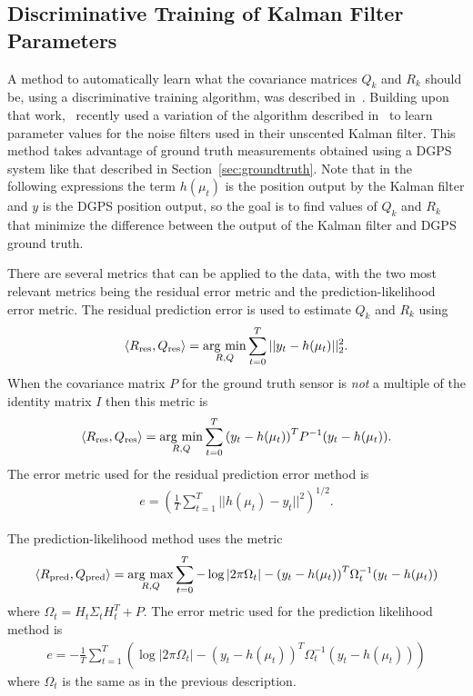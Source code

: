 \subsection{Discriminative Training of Kalman Filter Parameters}%
\label{sec:kftrainingparams}
A method to automatically learn what the covariance matrices $Q_k$ and $R_k$ should be, using a discriminative training algorithm, was described in~\cite{Abbeel-RSS-05}.
Building upon that work,~\cite{SakaiKuroda10} recently used a variation of the algorithm described in~\cite{Abbeel-RSS-05} to learn parameter values for the noise filters used in their unscented Kalman filter.
This method takes advantage of ground truth measurements obtained using a DGPS system like that described in Section~\ref{sec:groundtruth}.
Note that in the following expressions the term $h(\mu_t)$ is the position output by the Kalman filter and $y$ is the DGPS position output, so the goal is to find values of $Q_k$ and $R_k$ that minimize the difference between the output of the Kalman filter and DGPS ground truth.

There are several metrics that can be applied to the data, with the two most relevant metrics being the residual error metric and the prediction-likelihood error metric.
The residual prediction error is used to estimate $Q_k$ and $R_k$ using
\begin{align*}
\left<R_{\text{res}},Q_{\text{res}}\right> = \mathop{\arg\,\min}\limits_{R,Q}\sum_{t=0}^T ||y_t-h(\mu_t)||_2^2.
\end{align*}
When the covariance matrix $P$ for the ground truth sensor is \textit{not} a multiple of the identity matrix $I$ then this metric is
\begin{align*}
\left<R_{\text{res}},Q_{\text{res}}\right> = \mathop{\arg\,\min}\limits_{R,Q}\sum_{t=0}^T {(y_t-h(\mu_t))}^T P^{-1}(y_t-h(\mu_t)).
\end{align*}
The error metric used for the residual prediction error method is
\begin{align}
\label{eq:kftrainingres}
e = {\left(\frac{1}{T}\sum_{t=1}^T ||h(\mu_t)-y_t||^2\right)}^{1/2}.
\end{align}

The prediction-likelihood method uses the metric
\begin{align*}
\left<R_{\text{pred}},Q_{\text{pred}}\right> = \mathop{\arg\,\max}\limits_{R,Q}\sum_{t=0}^T -\log|2\pi\Omega_t| - {(y_t-h(\mu_t))}^T\Omega_t^{-1}(y_t-h(\mu_t))
\end{align*}
where $\Omega_t = H_t \Sigma_t H_t^T+P$.
The error metric used for the prediction likelihood method is
\begin{align}
\label{eq:kftrainingpred}
e = -\frac{1}{T}\sum_{t=1}^T \left(\log|2\pi\Omega_t| - {(y_t-h(\mu_t))}^T\Omega_t^{-1}(y_t-h(\mu_t))\right)
\end{align}
where $\Omega_t$ is the same as in the previous description.

